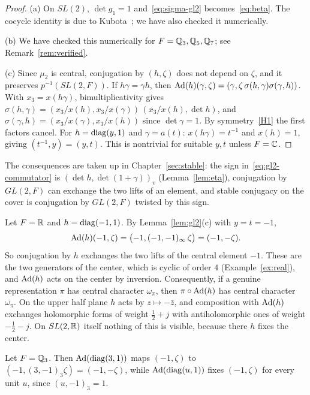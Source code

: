 \begin{proof}
(a) On $SL(2)$, $\det g_1=1$ and~\eqref{eq:sigma-gl2}
becomes~\eqref{eq:beta}. The cocycle identity is due to
Kubota~\cite{Ku69}; we have also checked it numerically.

(b) We have checked this numerically for $F=\mathbb{Q}_3,\mathbb{Q}_5,\mathbb{Q}_7$; see
Remark~\ref{rem:verified}.

(c) Since $\mu_2$ is central, conjugation by $(h,\zeta)$ does not depend
on $\zeta$, and it preserves $p^{-1}(SL(2,F))$. If $h\gamma=\gamma h$,
then $\operatorname{Ad}(h)(\gamma,\zeta)=(\gamma,\zeta\,\sigma(h,\gamma)
\sigma(\gamma,h))$. With $x_3=x(h\gamma)$, bimultiplicativity gives
$\sigma(h,\gamma)=(x_3/x(h),x_3/x(\gamma))\,(x_3/x(h),\det h)$, and
$\sigma(\gamma,h)=(x_3/x(\gamma),x_3/x(h))$ since $\det\gamma=1$. By
symmetry~\ref{H1} the first factors cancel. For $h=\operatorname{diag}(y,1)$ and
$\gamma=a(t)$: $x(h\gamma)=t^{-1}$ and $x(h)=1$, giving $(t^{-1},y)=
(y,t)$. This is nontrivial for suitable $y,t$ unless $F=\mathbb{C}$.
\end{proof}

The consequences are taken up in Chapter~\ref{sec:stable}: the sign
in~\eqref{eq:gl2-commutator} is $(\det h,\det(1+\gamma))_v$
(Lemma~\ref{lem:eta}), conjugation by $GL(2,F)$ can exchange the two lifts
of an element, and stable conjugacy on the cover is conjugation by
$GL(2,F)$ twisted by this sign.

\begin{example}\label{ex:gl2-center}
Let $F=\mathbb{R}$ and $h=\operatorname{diag}(-1,1)$. By Lemma~\ref{lem:gl2}(c) with $y=t=-1$,
\[
\operatorname{Ad}(h)(-1,\zeta)=\bigl(-1,(-1,-1)_\infty\,\zeta\bigr)=(-1,-\zeta).
\]
So conjugation by $h$ exchanges the two lifts of the central element
$-1$. These are the two generators of the center, which is cyclic of
order $4$ (Example~\ref{ex:real}), and $\operatorname{Ad}(h)$ acts on the center by
inversion. Consequently, if a genuine representation $\pi$ has central
character $\omega_\pi$, then $\pi\circ\operatorname{Ad}(h)$ has central character
$\overline{\omega_\pi}$. On the upper half plane $h$ acts by
$z\mapsto-\bar z$, and composition with $\operatorname{Ad}(h)$ exchanges holomorphic
forms of weight $\frac12+j$ with antiholomorphic ones of weight
$-\frac12-j$. On $SL(2,\mathbb{R})$ itself nothing of this is visible, because
there $h$ fixes the center.

Let $F=\mathbb{Q}_3$. Then $\operatorname{Ad}(\operatorname{diag}(3,1))$ maps $(-1,\zeta)$ to
$(-1,(3,-1)_3\zeta)=(-1,-\zeta)$, while $\operatorname{Ad}(\operatorname{diag}(u,1))$ fixes
$(-1,\zeta)$ for every unit $u$, since $(u,-1)_3=1$.
\end{example}

